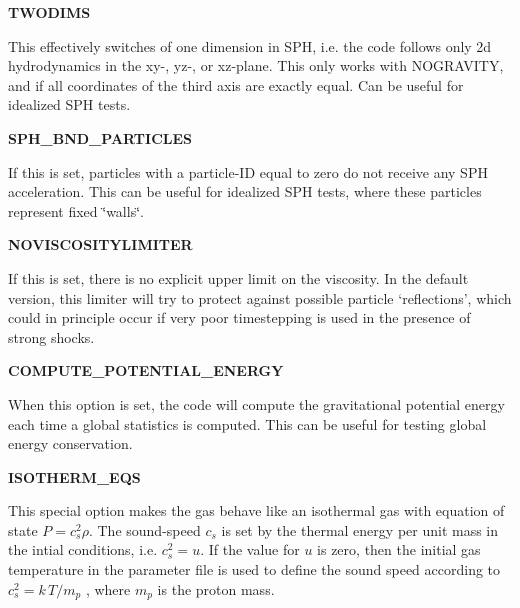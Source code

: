\begin{DoxyItemize}
\item {\bfseries \-T\-W\-O\-D\-I\-M\-S} \par
 \-This effectively switches of one dimension in \-S\-P\-H, i.\-e. the code follows only 2d hydrodynamics in the xy-\/, yz-\/, or xz-\/plane. \-This only works with \-N\-O\-G\-R\-A\-V\-I\-T\-Y, and if all coordinates of the third axis are exactly equal. \-Can be useful for idealized \-S\-P\-H tests.
\end{DoxyItemize}


\begin{DoxyItemize}
\item {\bfseries \-S\-P\-H\-\_\-\-B\-N\-D\-\_\-\-P\-A\-R\-T\-I\-C\-L\-E\-S} \par
 \-If this is set, particles with a particle-\/\-I\-D equal to zero do not receive any \-S\-P\-H acceleration. \-This can be useful for idealized \-S\-P\-H tests, where these particles represent fixed \char`\"{}walls\char`\"{}.
\end{DoxyItemize}


\begin{DoxyItemize}
\item {\bfseries \-N\-O\-V\-I\-S\-C\-O\-S\-I\-T\-Y\-L\-I\-M\-I\-T\-E\-R} \par
 \-If this is set, there is no explicit upper limit on the viscosity. \-In the default version, this limiter will try to protect against possible particle `reflections', which could in principle occur if very poor timestepping is used in the presence of strong shocks.
\end{DoxyItemize}


\begin{DoxyItemize}
\item {\bfseries \-C\-O\-M\-P\-U\-T\-E\-\_\-\-P\-O\-T\-E\-N\-T\-I\-A\-L\-\_\-\-E\-N\-E\-R\-G\-Y} \par
 \-When this option is set, the code will compute the gravitational potential energy each time a global statistics is computed. \-This can be useful for testing global energy conservation.
\end{DoxyItemize}


\begin{DoxyItemize}
\item {\bfseries \-I\-S\-O\-T\-H\-E\-R\-M\-\_\-\-E\-Q\-S} \par
 \-This special option makes the gas behave like an isothermal gas with equation of state $ P = c_s^2 \rho $. \-The sound-\/speed $ c_s $ is set by the thermal energy per unit mass in the intial conditions, i.\-e. $ c_s^2=u $. \-If the value for $ u $ is zero, then the initial gas temperature in the parameter file is used to define the sound speed according to $ c_s^2= k\,T/m_p $ , where $ m_p $ is the proton mass.
\end{DoxyItemize}


